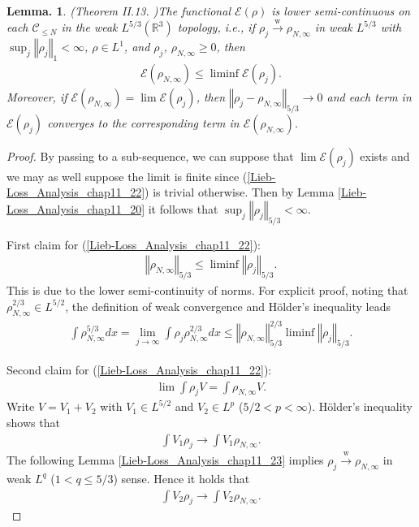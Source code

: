 \documentclass[openany, a4paper, oneside]{jsbook}
\theoremstyle{break}
\theoremstyle{breakdefn}
\newtheorem{lem}[thm]{Lemma.}
\newcommand{\norm}[1]{\left\Vert#1\right\Vert}
\newcommand{\bbRthree}{\mathbb{R}^3}
\newcommand{\calC}{\mathcal{C}}
\newcommand{\calE}{\mathcal{E}}
\newcommand{\limjtoinfty}{\lim_{j \to \infty}}
\newcommand{\rhoNinfty}{\rho_{N, \infty}}
\newcommand{\wto}{\xrightarrow{\text{w}}}
\begin{document}
\begin{lem}\textup{(Theorem II.13. \cite{LiebSimon1})}\label{Lieb-Loss_Analysis_chap11_24}
 The functional $\calE (\rho)$ is lower semi-continuous on each $\calC_{\leq N}$ in the weak $L^{5/3} (\bbRthree)$ topology, i.e.,
 if $\rho_j \wto \rhoNinfty$ in weak $L^{5/3}$ with $\sup_j \norm{\rho_j}_1 < \infty$, $\rho \in L^1$, and $\rho_j$, $\rhoNinfty \geq 0$,
 then
 \begin{align}
  \calE (\rhoNinfty)
  \leq
  \liminf \calE (\rho_j). \label{Lieb-Loss_Analysis_chap11_22}
 \end{align}
 Moreover, if $\calE (\rhoNinfty) = \lim \calE (\rho_j)$, then $\norm{\rho_j - \rhoNinfty}_{5/3} \to 0$ and
 each term in $\calE (\rho_j)$ converges to the corresponding term in $\calE (\rhoNinfty)$.
\end{lem}
\begin{proof}
By passing to a sub-sequence, we can suppose that $\lim \calE (\rho_j)$ exists and we may as well suppose the limit is finite
since (\ref{Lieb-Loss_Analysis_chap11_22}) is trivial otherwise.
Then by Lemma \ref{Lieb-Loss_Analysis_chap11_20} it follows that $\sup_j \norm{\rho_j}_{5/3} < \infty$.

First claim for (\ref{Lieb-Loss_Analysis_chap11_22}):
\begin{align}
 \norm{\rhoNinfty}_{5/3}
 \leq
 \liminf \norm{\rho_j}_{5/3}.
\end{align}
This is due to the lower semi-continuity of norms.
For explicit proof, noting that $\rhoNinfty^{2/3} \in L^{5/2}$, the definition of weak convergence and H\"older's inequality leads
\begin{align}
 \int \rhoNinfty^{5/3} dx
 =
 \limjtoinfty \int \rho_j \rhoNinfty^{2/3} dx
 \leq
 \norm{\rhoNinfty}_{5/3}^{2/3} \liminf \norm{\rho_j}_{5/3}.
\end{align}

Second claim for (\ref{Lieb-Loss_Analysis_chap11_22}):
\begin{align}
 \lim \int \rho_j V
 =
 \int \rhoNinfty V.
\end{align}
Write $V = V_1 + V_2$ with $V_1 \in L^{5/2}$ and $V_2 \in L^p$ ($5/2 < p < \infty$).
H\"older's inequality shows that
\begin{align}
 \int V_1 \rho_j \to \int V_1 \rhoNinfty.
\end{align}
The following Lemma \ref{Lieb-Loss_Analysis_chap11_23} implies $\rho_j \wto \rhoNinfty$ in weak $L^q$ ($1 < q \leq 5/3$) sense.
Hence it holds that
\begin{align}
 \int V_2 \rho_j \to \int V_2 \rhoNinfty.
\end{align}


\end{proof}
\end{document}
